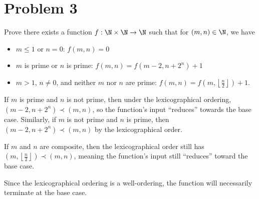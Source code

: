 \documentclass[10pt]{mypackage}
\begin{document}
\section{Problem 3}%
\begin{problem}
  Prove there exists a function $f: \N\times \N\rightarrow \N$ such that for $\left(m,n\right)\in \N$, we have
  \begin{itemize}
    \item $m\leq 1$ or $n = 0$: $f(m,n) = 0$
    \item $m$ is prime or $n$ is prime: $f\left(m,n\right) = f\left(m-2,n + 2^{n}\right) + 1$
    \item $m > 1$, $n \neq 0$, and neither $m$ nor $n$ are prime: $f\left(m,n\right) = f\left(m,\left\lfloor\frac{n}{2}\right\rfloor\right) + 1$.
  \end{itemize}
\end{problem}
\begin{solution}
  If $m$ is prime and $n$ is not prime, then under the lexicographical ordering, $\left(m-2,n + 2^n\right) \prec \left(m,n\right)$, so the function's input ``reduces'' towards the base case. Similarly, if $m$ is not prime and $n$ is prime, then $\left(m-2,n + 2^n\right) \prec \left(m,n\right)$ by the lexicographical order.\newline

  If $m$ and $n$ are composite, then the lexicographical order still has $\left(m,\left\lfloor\frac{n}{2}\right\rfloor\right) \prec \left(m,n\right)$, meaning the function's input still ``reduces'' toward the base case.\newline

  Since the lexicographical ordering is a well-ordering, the function will necessarily terminate at the base case.
\end{solution}
\end{document}
